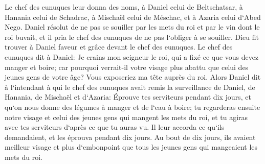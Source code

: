 \verse Le chef des eunuques leur donna des noms, à Daniel celui de Beltschatsar, à Hanania celui de Schadrac, à Mischaël celui de Méschac, et à Azaria celui d`Abed Nego. 
\verse Daniel résolut de ne pas se souiller par les mets du roi et par le vin dont le roi buvait, et il pria le chef des eunuques de ne pas l`obliger à se souiller. 
\verse Dieu fit trouver à Daniel faveur et grâce devant le chef des eunuques. 
\verse Le chef des eunuques dit à Daniel: Je crains mon seigneur le roi, qui a fixé ce que vous devez manger et boire; car pourquoi verrait-il votre visage plus abattu que celui des jeunes gens de votre âge? Vous exposeriez ma tête auprès du roi. 
\verse Alors Daniel dit à l`intendant à qui le chef des eunuques avait remis la surveillance de Daniel, de Hanania, de Mischaël et d`Azaria: 
\verse Éprouve tes serviteurs pendant dix jours, et qu`on nous donne des légumes à manger et de l`eau à boire; 
\verse tu regarderas ensuite notre visage et celui des jeunes gens qui mangent les mets du roi, et tu agiras avec tes serviteurs d`après ce que tu auras vu. 
\verse Il leur accorda ce qu`ils demandaient, et les éprouva pendant dix jours. 
\verse Au bout de dix jours, ils avaient meilleur visage et plus d`embonpoint que tous les jeunes gens qui mangeaient les mets du roi. 
